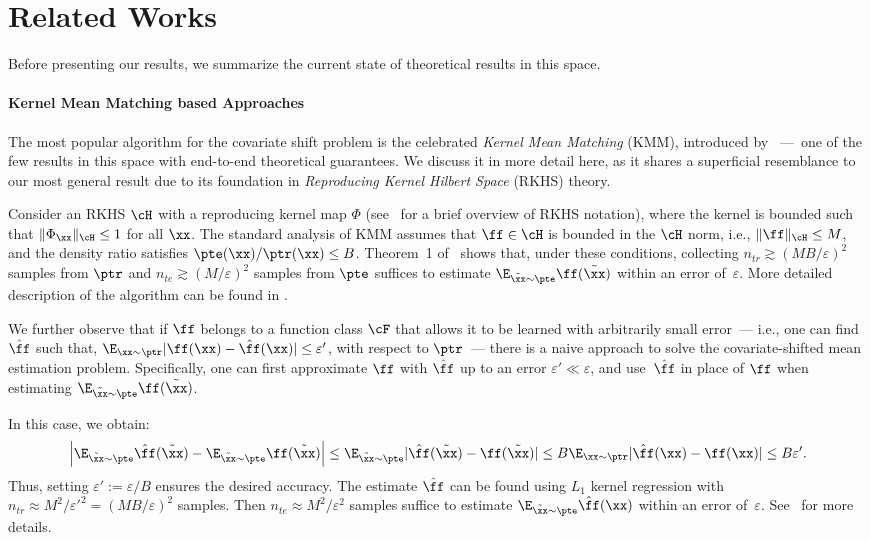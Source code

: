 \section{Related Works}
Before presenting our results, we summarize the current state of theoretical results in this space.

\paragraph{Kernel Mean Matching based Approaches}
The most popular algorithm for the covariate shift problem is the celebrated \emph{Kernel Mean Matching} (KMM), introduced by \cite{huang2006correcting}~---~one of the few results in this space with end-to-end theoretical guarantees. We discuss it in more detail here, as it shares a superficial resemblance to our most general result due to its foundation in \emph{Reproducing Kernel Hilbert Space} (RKHS) theory. 
 

Consider an RKHS $\cH$ with a reproducing kernel map $\Phi$ (see~ for a brief overview of RKHS notation),  where the kernel is bounded such that $\|\Phi_{\xx}\|_{\cH} \leq 1$ for all $\xx$. The standard analysis of KMM assumes that $\ff \in \cH$ is bounded in the $\cH$ norm, i.e., $\|\ff\|_{\cH} \leq M$, and the density ratio satisfies $\pte(\xx)/\ptr(\xx) \leq B$. Theorem~1 of~\textcite{yu2012analysis} shows that, under these conditions, collecting $n_{tr} \gtrsim (MB/\varepsilon)^2$ samples from $\ptr$ and $n_{te} \gtrsim (M/\varepsilon)^2$ samples from $\pte$ suffices to estimate $\E_{\tilde{\xx} \sim \pte} \ff(\tilde{\xx})$ within an error of~$\varepsilon$. More detailed description of the algorithm can be found in .

We further observe that if $\ff$ belongs to a function class $\cF$ that allows it to be learned with arbitrarily small error~--- i.e., one can find $\hat{\ff}$ such that, $\E_{\xx \sim \ptr} |\ff(\xx) - \hat{\ff}(\xx)| \leq \varepsilon'$, with respect to $\ptr$~--- there is a naive approach to solve the covariate-shifted mean estimation problem. Specifically, one can first approximate $\ff$ with $\hat{\ff}$ up to an error $\varepsilon' \ll \varepsilon$, and use~$\hat{\ff}$ in place of $\ff$ when estimating $\E_{\tilde{\xx}\sim\pte} \ff(\tilde{\xx})$. 

In this case, we obtain:
\begin{equation*}
\left|\E_{\tilde{\xx} \sim \pte} \hat{\ff}(\tilde{\xx}) - \E_{\tilde{\xx}\sim\pte} \ff(\tilde{\xx})\right| \leq \E_{\tilde{\xx} \sim \pte} |\hat{\ff}(\tilde{\xx}) - \ff(\tilde{\xx})| \leq B \E_{\xx \sim \ptr} |\hat{\ff}(\xx) - \ff(\xx)| \leq B \varepsilon'.
\end{equation*}
Thus, setting $\varepsilon':= \varepsilon/B$ ensures the desired accuracy. The estimate $\hat{\ff}$ can be found using $L_1$ kernel regression with $n_{tr} \approx M^2/{\varepsilon'}^2 = (MB/\varepsilon)^2$ samples. Then $n_{te} \approx M^2/\varepsilon^2$ samples suffice to estimate $\E_{\tilde{\xx} \sim 
\pte} \hat{\ff}(\xx)$ within an error of~$\varepsilon$. See~ for more details.

